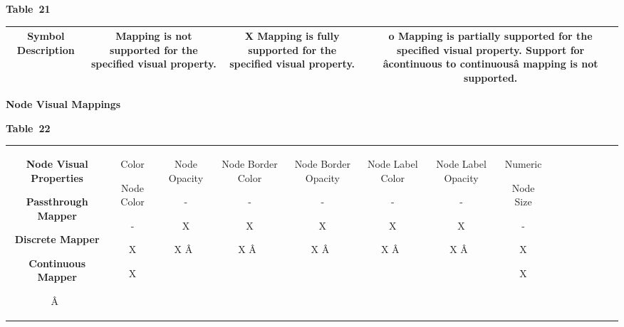  \textbf{Table 21}
\begin{tabular}{|c|c|c|c|}
\hline 
\textbf{Symbol} \textbf{Description} &
Mapping is not supported for the specified visual property.  &
X Mapping is fully supported for the specified visual property.  &
o Mapping is partially supported for the specified visual property. Support for \^acontinuous to continuous\^a mapping is not supported.  \\
\hline 
\end{tabular}

\textbf{Node Visual Mappings}

 \textbf{Table 22}
\begin{tabular}{|c|c|c|c|c|c|c|c|c|c|c|c|c|c|c|}
\hline 
 \textbf{Node Visual Properties}

 \textbf{Passthrough Mapper}

 \textbf{Discrete Mapper}

 \textbf{Continuous Mapper}

\^A  &

 Color


  Node Color 


  - 


  X 


  X 
 &

  Node Opacity 


  - 


  X 


  X 
\^A  &

  Node Border Color 


  - 


  X 


  X 
\^A  &

  Node Border Opacity 


  - 


  X 


  X 
\^A  &

  Node Label Color 


  - 


  X 


  X 
\^A  &

  Node Label Opacity 


  - 


  X 


  X 
\^A  &

 Numeric 


  Node Size 


  - 


  X 


  X 
 &


\end{tabular}
